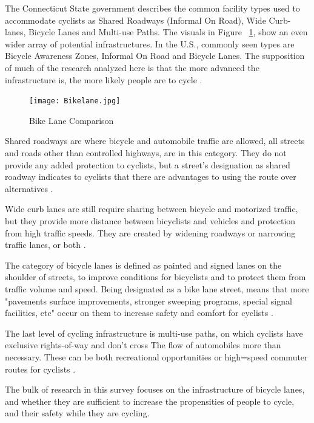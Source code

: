 \documentclass[12pt, letterpaper]{article}
\begin{document}
The Connecticut State government describes the common facility types used to accommodate cyclists as Shared Roadways (Informal On Road), Wide Curb-lanes, Bicycle Lanes and Multi-use Paths. The visuals in Figure ~\ref{fig:bikelane}, show an even wider array of potential infrastructures. In the U.S., commonly seen types are Bicycle Awareness Zones, Informal On Road and Bicycle Lanes. The supposition of much of the research analyzed here is that the more advanced the infrastructure is, the more likely people are to cycle \cite{1MateoBabiano2016}.\par 

\begin{figure}[tbp]
    \centering
    \texttt{[image: Bikelane.jpg]}
    \caption{Bike Lane Comparison \cite{1MateoBabiano2016}}
    \label{fig:bikelane}
\end{figure}

Shared roadways are where bicycle and automobile traffic are allowed, all streets and roads other than controlled highways, are in this category. They do not provide any added protection to cyclists, but a street's designation as shared roadway indicates to cyclists that there are advantages to using the route over alternatives \cite{CTDOT2023}. \par 
Wide curb lanes are still require sharing between bicycle and motorized traffic, but they provide more distance between bicyclists and vehicles and protection from high traffic speeds. They are created by widening roadways or narrowing traffic lanes, or both \cite{CTDOT2023}.\par 
The category of bicycle lanes is defined as painted and signed lanes on the shoulder of streets, to improve conditions for bicyclists and to protect them from traffic volume and speed. Being designated as a bike lane street, means that more "pavements surface improvements, stronger sweeping programs, special signal facilities, etc" occur on them to increase safety and comfort for cyclists \cite{CTDOT2023}. \par
The last level of cycling infrastructure is multi-use paths, on which cyclists have exclusive rights-of-way and don't cross The flow of automobiles more than necessary. These can be both recreational opportunities or high=speed commuter routes for cyclists \cite{CTDOT2023}. \par
The bulk of research in this survey focuses on the infrastructure of bicycle lanes, and whether they are sufficient to increase the propensities of people to cycle, and their safety while they are cycling. 
\end{document}
